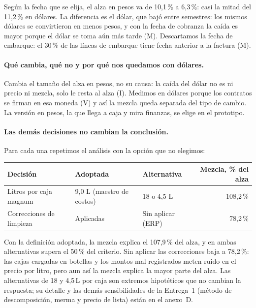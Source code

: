 \noindent Según la fecha que se elija, el alza en pesos va de 10,1\,\% a 6,3\,\%: casi la mitad del 11,2\,\% en dólares. La diferencia es el dólar, que bajó entre semestres: los mismos dólares se convirtieron en menos pesos, y con la fecha de cobranza la caída es mayor porque el dólar se toma aún más tarde (M). Descartamos la fecha de embarque: el 30\,\% de las líneas de embarque tiene fecha anterior a la factura (M).

\paragraph{Qué cambia, qué no y por qué nos quedamos con dólares.} Cambia el tamaño del alza en pesos, no su causa: la caída del dólar no es ni precio ni mezcla, solo le resta al alza (I). Medimos en dólares porque los contratos se firman en esa moneda (V) y así la mezcla queda separada del tipo de cambio. La versión en pesos, la que llega a caja y mira finanzas, se elige en el prototipo.

\paragraph{Las demás decisiones no cambian la conclusión.} Para cada una repetimos el análisis con la opción que no elegimos:

\begin{center}
\small
\renewcommand{\arraystretch}{1.15}
\begin{tabular}{@{}l l l r@{}}
\toprule
\textbf{Decisión} & \textbf{Adoptada} & \textbf{Alternativa} & \textbf{Mezcla, \% del alza} \\
\midrule
Litros por caja magnum & 9,0 L (maestro de costos) & 18 o 4,5 L & 108,2\,\% \\
Correcciones de limpieza & Aplicadas & Sin aplicar (ERP) & 78,2\,\% \\
\bottomrule
\end{tabular}
\label{tab:sensibilidades}
\end{center}

\noindent Con la definición adoptada, la mezcla explica el 107,9\,\% del alza, y en ambas alternativas supera el 50\,\% del criterio. Sin aplicar las correcciones baja a 78,2\,\%: las cajas cargadas en botellas y los montos mal registrados meten ruido en el precio por litro, pero aun así la mezcla explica la mayor parte del alza. Las alternativas de 18 y 4,5\,L por caja son extremos hipotéticos que no cambian la respuesta; su detalle y las demás sensibilidades de la Entrega~1 (método de descomposición, merma y precio de lista) están en el anexo~D.